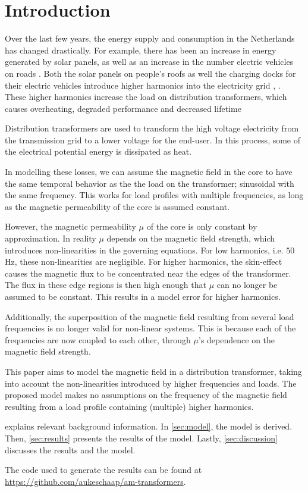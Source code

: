 \chapter{Introduction}

Over the last few years, the energy supply and consumption in the Netherlands has changed drastically. For example, there has been an increase in energy generated by solar panels, as well as an increase in the number electric vehicles on roads \cite{vanDijk2022}. 
Both the solar panels on people's roofs as well the charging docks for their electric vehicles introduce higher harmonics into the electricity grid \cite{energietransitie}, \cite{energieVerbenCons}.
These higher harmonics increase the load on distribution transformers, which causes overheating, degraded performance and decreased lifetime \cite{vanDijk2022}

Distribution transformers are used to transform the high voltage electricity from the transmission grid to a lower voltage for the end-user.
In this process, some of the electrical potential energy is dissipated as heat. 

In modelling these losses, we can assume the magnetic field in the core to have the same temporal behavior as the the load on the transformer; sinusoidal with the same frequency. 
This works for load profiles with multiple frequencies, as long as the magnetic permeability of the core is assumed constant.

However, the magnetic permeability $\mu$ of the core is only constant by approximation. In reality $\mu$ depends on the magnetic field strength, which introduces non-linearities in the governing equations.
For low harmonics, i.e. $50$ Hz, these non-linearities are negligible.
For higher harmonics, the skin-effect causes the magnetic flux to be concentrated near the edges of the transformer. 
The flux in these edge regions is then high enough that $\mu$ can no longer be assumed to be constant. 
This results in a model error for higher harmonics.

Additionally, the superposition of the magnetic field resulting from several load frequencies is no longer valid for non-linear systems.
This is because each of the frequencies are now coupled to each other, through $\mu$'s dependence on the magnetic field strength.

This paper aims to model the magnetic field in a distribution transformer, taking into account the non-linearities introduced by higher frequencies and loads.
The proposed model makes no assumptions on the frequency of the magnetic field resulting from a load profile containing (multiple) higher harmonics.

 explains relevant background information. 
In \cref{sec:model}, the model is derived. 
Then, \cref{sec:results} presents the results of the model. 
Lastly, \cref{sec:discussion} discusses the results and the model.

The code used to generate the results can be found at \url{https://github.com/aukeschaap/am-transformers}.

